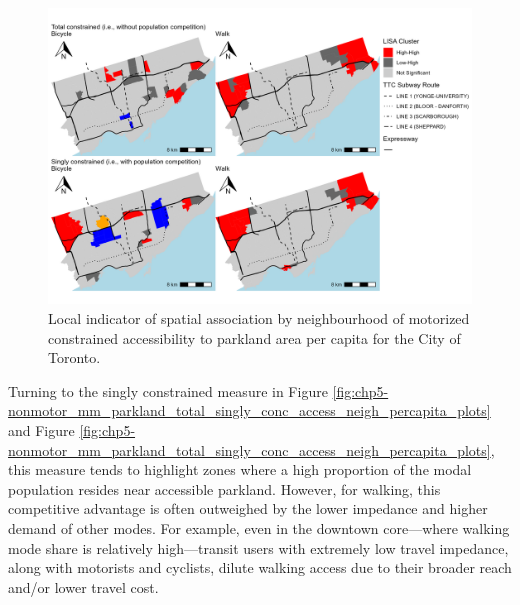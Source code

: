 \documentclass[
11pt, %
oneside, %
english, %
singlespacing, %
]{macthesis} %
\begin{document}
\begin{figure}

{\centering \includegraphics[width=6in]{./data/figures/chp5-LISA_allnonmotorized_neigh_plots} 

}

\caption{\label{fig:chp5-LISA_allnonmotorized_neigh_plots} Local indicator of spatial association by neighbourhood of motorized constrained accessibility to parkland area per capita for the City of Toronto.}\label{fig:unnamed-chunk-85}
\end{figure}

Turning to the singly constrained measure in Figure \ref{fig:chp5-nonmotor_mm_parkland_total_singly_conc_access_neigh_percapita_plots} and Figure \ref{fig:chp5-nonmotor_mm_parkland_total_singly_conc_access_neigh_percapita_plots}, this measure tends to highlight zones where a high proportion of the modal population resides near accessible parkland. However, for walking, this competitive advantage is often outweighed by the lower impedance and higher demand of other modes. For example, even in the downtown core---where walking mode share is relatively high---transit users with extremely low travel impedance, along with motorists and cyclists, dilute walking access due to their broader reach and/or lower travel cost.
\end{document}
